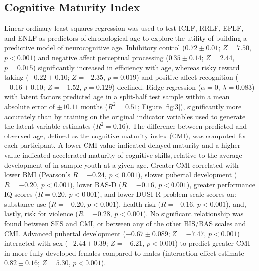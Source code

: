 \documentclass[utf8]{stylesheet}
\begin{document}
\subsection{Cognitive Maturity Index} Linear ordinary least squares regression was used to test ICLF, RRLF, EPLF, and ENLF as predictors of chronological age to explore the utility of building a predictive model of neurocognitive age. Inhibitory control ($0.72\pm0.01$; $Z=7.50$, $p<0.001$) and negative affect perceptual processing ($0.35\pm0.14$; $Z=2.44$, $p=0.015$) significantly increased in efficiency with age, whereas risky reward taking ($-0.22\pm0.10$; $Z=-2.35$, $p = 0.019$) and positive affect recognition ($-0.16\pm0.10$; $Z=-1.52$, $p=0.129$) declined. Ridge regression ($\alpha = 0$, $\lambda = 0.083$) with latent factors predicted age in a split-half test sample within a mean absolute error of $\pm 10.11$ months ($R^2=0.51$; Figure \ref{fig:3}), significantly more accurately than by training on the original indicator variables used to generate the latent variable estimates ($R^2=0.16$). The difference between predicted and observed age, defined as the cognitive maturity index (CMI), was computed for each participant. A lower CMI value indicated delayed maturity and a higher value indicated accelerated maturity of cognitive skills, relative to the average development of in-sample youth at a given age. Greater CMI correlated with lower BMI (Pearson's $R=-0.24$, $p<0.001$), slower pubertal development ($R=-0.20$, $p<0.001$), lower BAS-D ($R=-0.16$, $p<0.001$), greater performance IQ scores ($R=0.20$, $p<0.001$), and lower DUSI-R problem scale scores on: substance use ($R=-0.20$, $p<0.001$), health risk ($R=-0.16$, $p<0.001$), and, lastly, risk for violence ($R=-0.28$, $p<0.001$). No significant relationship was found between SES and CMI, or between any of the other BIS/BAS scales and CMI. Advanced pubertal development ($-0.67\pm0.089$; $Z=-7.47$, $p<0.001$) interacted with sex ($-2.44\pm0.39$; $Z=-6.21$, $p<0.001$) to predict greater CMI in more fully developed females compared to males (interaction effect estimate $0.82\pm0.16$; $Z=5.30$, $p<0.001$).
%
\end{document}
